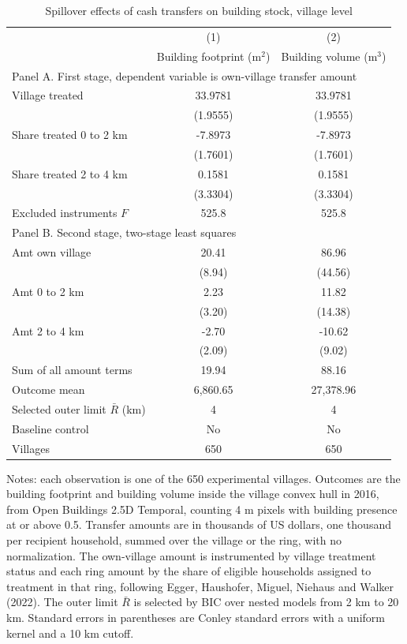 \begin{table}[htbp]
\centering
\caption{Spillover effects of cash transfers on building stock, village level}
\label{tab:eq2-village}
\begin{tabular}{lcc}
\hline\hline
 & (1) & (2) \\
 & Building footprint (m$^2$) & Building volume (m$^3$) \\
\hline
\multicolumn{3}{l}{Panel A. First stage, dependent variable is own-village transfer amount} \\
Village treated & 33.9781 & 33.9781 \\
 & (1.9555) & (1.9555) \\
Share treated 0 to 2 km & -7.8973 & -7.8973 \\
 & (1.7601) & (1.7601) \\
Share treated 2 to 4 km & 0.1581 & 0.1581 \\
 & (3.3304) & (3.3304) \\
Excluded instruments $F$ & 525.8 & 525.8 \\
\hline
\multicolumn{3}{l}{Panel B. Second stage, two-stage least squares} \\
Amt own village & 20.41 & 86.96 \\
 & (8.94) & (44.56) \\
Amt 0 to 2 km & 2.23 & 11.82 \\
 & (3.20) & (14.38) \\
Amt 2 to 4 km & -2.70 & -10.62 \\
 & (2.09) & (9.02) \\
Sum of all amount terms & 19.94 & 88.16 \\
\hline
Outcome mean & 6,860.65 & 27,378.96 \\
Selected outer limit $\bar{R}$ (km) & 4 & 4 \\
Baseline control & No & No \\
Villages & 650 & 650 \\
\hline\hline
\end{tabular}
\begin{minipage}{\textwidth}
\footnotesize
Notes: each observation is one of the 650 experimental villages. Outcomes are the building footprint and building volume inside the village convex hull in 2016, from Open Buildings 2.5D Temporal, counting 4 m pixels with building presence at or above 0.5. Transfer amounts are in thousands of US dollars, one thousand per recipient household, summed over the village or the ring, with no normalization. The own-village amount is instrumented by village treatment status and each ring amount by the share of eligible households assigned to treatment in that ring, following Egger, Haushofer, Miguel, Niehaus and Walker (2022). The outer limit $\bar{R}$ is selected by BIC over nested models from 2 km to 20 km. Standard errors in parentheses are Conley standard errors with a uniform kernel and a 10 km cutoff.
\end{minipage}
\end{table}
